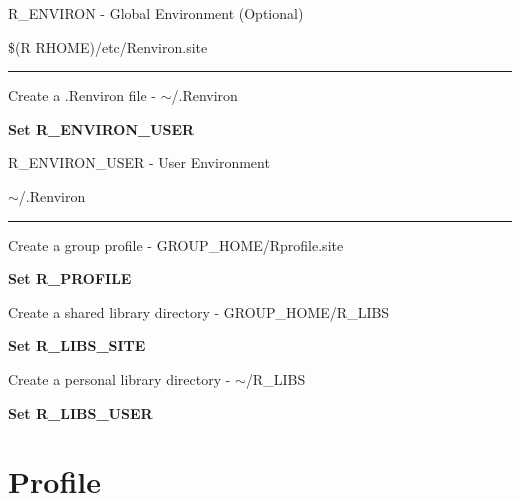 \documentclass{beamer}
\begin{document}
\begin{frame}{R\_ENVIRON - Global Environment (Optional)}

\begin{center}\$(R RHOME)/etc/Renviron.site\\ \end{center}
\begin{center}
\rule{4cm}{0.6pt}
\end{center}

\bigskip

\begin{center}Create a .Renviron file - $\sim$/.Renviron\\\end{center}
\textbf{Set R\_ENVIRON\_USER} \\

\end{frame}

\begin{frame}{R\_ENVIRON\_USER - User Environment}

\begin{center} $\sim$/.Renviron\\ \end{center}
\begin{center}
\rule{4cm}{0.6pt}
\end{center}

\begin{center}Create a group profile - GROUP\_HOME/Rprofile.site\\ \end{center}

\textbf{Set R\_PROFILE}

\begin{center}Create a shared library directory - GROUP\_HOME/R\_LIBS\\\end{center}

\textbf{Set R\_LIBS\_SITE}

\begin{center}Create a personal library directory - $\sim$/R\_LIBS\\\end{center}

\textbf{Set R\_LIBS\_USER}
\end{frame}

\section*{Profile}
\end{document}

